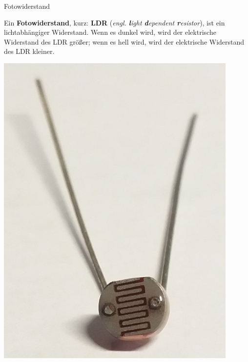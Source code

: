 \newpage
\begin{zsfg}{Fotowiderstand}
	\begin{minipage}{0.7\textwidth}
		Ein \textbf{Fotowiderstand}, kurz: \textbf{LDR} (\emph{engl. \textbf{l}ight \textbf{d}ependent \textbf{r}esistor}), ist ein lichtabhängiger Widerstand. Wenn es dunkel wird, wird der elektrische Widerstand des LDR größer; wenn es hell wird, wird der elektrische Widerstand des LDR kleiner.
	\end{minipage}
	\hfill
	\begin{minipage}{0.28\textwidth}
		\begin{minipage}{0.48\textwidth}
			\centering
			\includegraphics[width=0.9\textwidth]{./pics/ldr.jpg}

\end{minipage}
\end{minipage}
\end{zsfg}
